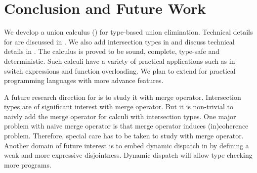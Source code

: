 \section{Conclusion and Future Work}
\label{sec:conclusion}

We develop a union calculus (\cal) for type-based union elimination.
Technical details for \cal are discussed in .
We also add intersection types in \cal and discuss technical details in .
The calculus is proved to be sound, complete, type-safe and deterministic.
Such calculi have a variety of practical applications such as in switch expressions
and function overloading. We plan to extend \cal for practical programming languages
with more advance features.

A future research direction for \cal is to study it with merge operator.
Intersection types are of significant interest with merge operator. But it is non-trivial
to naivly add the merge operator for calculi with intersection types.
One major problem with naive merge operator is that merge operator induces (in)coherence problem.
Therefore, special care has to be taken to study \cal with merge operator.
Another domain of future interest is to embed dynamic dispatch in \cal by defining a weak
and more expressive disjointness. Dynamic dispatch will allow type checking more programs.